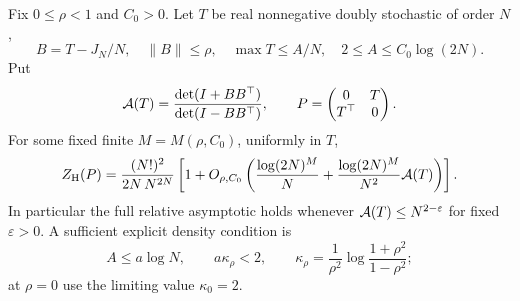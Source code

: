 \begin{theorem}
\label{thm:criticalrelative}
Fix \(0\leq\rho<1\) and \(C_0>0\).
Let \(T\) be real nonnegative doubly stochastic of order \(N\),
\[
 B=T-J_N/N,\quad \|B\|\leq\rho,\quad
 \max T\leq A/N,\quad 2\leq A\leq C_0\log(2N).
\]
Put
\[
 {\cal A}(T)=
        \frac{\det(I+BB^\top)}{\det(I-BB^\top)},\qquad
 P=\begin{pmatrix}0&T\\T^\top&0\end{pmatrix}.
\]
For some fixed finite \(M=M(\rho,C_0)\), uniformly in \(T\),
\[
 Z_{\rm H}(P)=\frac{(N!)^2}{2N\,N^{2N}}
 \left[1+O_{\rho,C_0}\left(
       \frac{\log(2N)^M}{N}
         +\frac{\log(2N)^M}{N^2}{\cal A}(T)\right)\right].
\]
In particular the full relative asymptotic holds whenever
\({\cal A}(T)\leq N^{2-\varepsilon}\) for fixed
\(\varepsilon>0\).
A sufficient explicit density condition is
\[
 A\leq a\log N,\qquad a\kappa_\rho<2,\qquad
 \kappa_\rho=\frac1{\rho^2}
                   \log\frac{1+\rho^2}{1-\rho^2};
\]
at \(\rho=0\) use the limiting value \(\kappa_0=2\).
\end{theorem}
